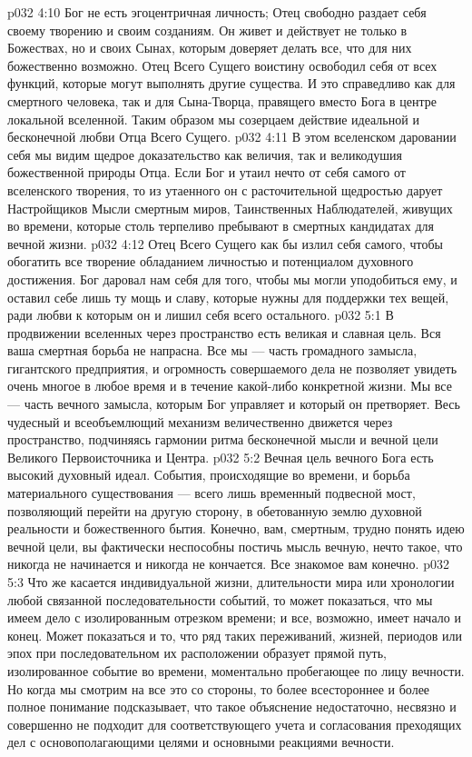 \vs p032 4:10 \pc Бог не есть эгоцентричная личность; Отец свободно раздает себя своему творению и своим созданиям. Он живет и действует не только в Божествах, но и своих Сынах, которым доверяет делать все, что для них божественно возможно. Отец Всего Сущего воистину освободил себя от всех функций, которые могут выполнять другие существа. И это справедливо как для смертного человека, так и для Сына\hyp{}Творца, правящего вместо Бога в центре локальной вселенной. Таким образом мы созерцаем действие идеальной и бесконечной любви Отца Всего Сущего.
\vs p032 4:11 В этом вселенском даровании себя мы видим щедрое доказательство как величия, так и великодушия божественной природы Отца. Если Бог и утаил нечто от себя самого от вселенского творения, то из утаенного он с расточительной щедростью дарует Настройщиков Мысли смертным миров, Таинственных Наблюдателей, живущих во времени, которые столь терпеливо пребывают в смертных кандидатах для вечной жизни.
\vs p032 4:12 Отец Всего Сущего как бы излил себя самого, чтобы обогатить все творение обладанием личностью и потенциалом духовного достижения. Бог даровал нам себя для того, чтобы мы могли уподобиться ему, и оставил себе лишь ту мощь и славу, которые нужны для поддержки тех вещей, ради любви к которым он и лишил себя всего остального.
\vs p032 5:1 В продвижении вселенных через пространство есть великая и славная цель. Вся ваша смертная борьба не напрасна. Все мы --- часть громадного замысла, гигантского предприятия, и огромность совершаемого дела не позволяет увидеть очень многое в любое время и в течение какой\hyp{}либо конкретной жизни. Мы все --- часть вечного замысла, которым Бог управляет и который он претворяет. Весь чудесный и всеобъемлющий механизм величественно движется через пространство, подчиняясь гармонии ритма бесконечной мысли и вечной цели Великого Первоисточника и Центра.
\vs p032 5:2 Вечная цель вечного Бога есть высокий духовный идеал. События, происходящие во времени, и борьба материального существования --- всего лишь временный подвесной мост, позволяющий перейти на другую сторону, в обетованную землю духовной реальности и божественного бытия. Конечно, вам, смертным, трудно понять идею вечной цели, вы фактически неспособны постичь мысль вечную, нечто такое, что никогда не начинается и никогда не кончается. Все знакомое вам конечно.
\vs p032 5:3 \pc Что же касается индивидуальной жизни, длительности мира или хронологии любой связанной последовательности событий, то может показаться, что мы имеем дело с изолированным отрезком времени; и все, возможно, имеет начало и конец. Может показаться и то, что ряд таких переживаний, жизней, периодов или эпох при последовательном их расположении образует прямой путь, изолированное событие во времени, моментально пробегающее по лицу вечности. Но когда мы смотрим на все это со стороны, то более всестороннее и более полное понимание подсказывает, что такое объяснение недостаточно, несвязно и совершенно не подходит для соответствующего учета и согласования преходящих дел с основополагающими целями и основными реакциями вечности.
